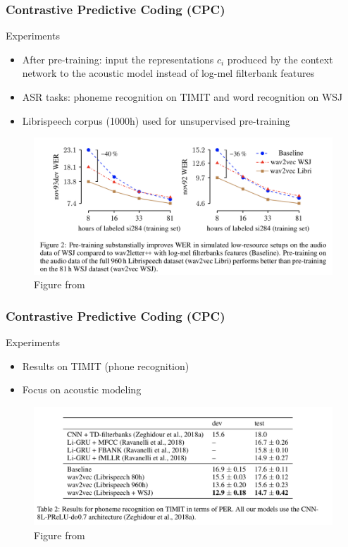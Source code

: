 \documentclass[table]{beamer}
\begin{document}
\begin{frame}
	\frametitle{Contrastive Predictive Coding (CPC)}
	Experiments
		\begin{itemize}
			\item After pre-training:  input the representations $c_i$ produced by the context network to the acoustic model instead of log-mel filterbank features
			\item ASR tasks: phoneme recognition on TIMIT and word recognition on WSJ
			\item Librispeech corpus (1000h) used for unsupervised pre-training
		\end{itemize} 


		\begin{figure}
			\centering
			\includegraphics[scale=0.36]	{results.png} 
			\caption{Figure from \citep{DBLP:journals/corr/abs-1904-05862}}
			\label{fig:results}
			\end{figure}
	
\end{frame}


\begin{frame}
	\frametitle{Contrastive Predictive Coding (CPC)}
	Experiments
		\begin{itemize}
			\item Results on TIMIT (phone recognition)
			\item Focus on acoustic modeling
		\end{itemize} 


		\begin{figure}
			\centering
			\includegraphics[scale=0.36]	{timit.png} 
			\caption{Figure from \citep{DBLP:journals/corr/abs-1904-05862}}
			\label{fig:results}
			\end{figure}
	
\end{frame}
\end{document}
